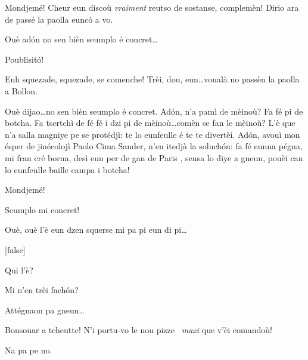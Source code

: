 \begin{drama}

\Brunospeaks {} Mondjemé! Cheur eun discoù \textit{vraiment} reutso de sostanse,  complemèn!  Dirio ara de passé la paolla eunc\'o a vo.

\Jordyspeaks Ouè ad\'on no sen bièn seumplo é concret\ldots

\Brunospeaks Poublisit\'o!



\Brunospeaks {} Euh squezade, squezade, se comenche! Trèi, dou, eun\ldots voualà no passèn la paolla a Bollon.

\Jordyspeaks Ouè dijao\ldots no sen bièn seumplo é concret. Ad\'on, n'a pamì de mèinoù? Fa fé pi de botcha. Fa tsertchì de fé fé i dzi pi de mèinoù\ldots comèn se fan le mèinoù? L'è que n'a salla magniye pe se protédjì: te lo eunfeulle  é te te divertèi. Ad\'on, avouì mon ésper de jinécolojì Paolo Cima Sander, n'en itedjà la soluch\'on: fa fé eunna pégna, mi fran cré borna, desì eun per de gan de Paris \condom, sensa lo diye a gneun, pouèi can lo eunfeulle baille campa i botcha!

\Brunospeaks {} Mondjemé!

\Jordyspeaks Seumplo mi concret!

\Brunospeaks Ouè, ouè l'è eun dzen squerse mi pa pi eun di pi\ldots

[false]

\Brunospeaks Qui l'è?

\Noteospeaks Mi n'en trèi fach\'on?

\Brunospeaks Attégnaon pa gneun\ldots


\Fattorinospeaks Bonsouar a tcheutte! N'i portu-vo le nou pizze \pizza\ \textit{maxi} que v'èi comandoù!

\Noteospeaks Na pa pe no.


\end{drama}

